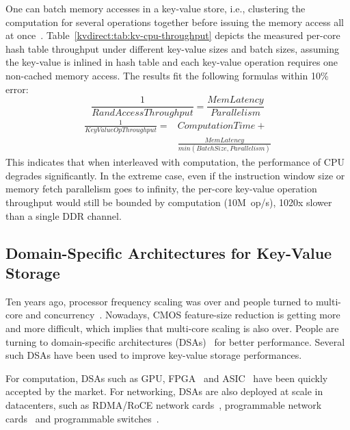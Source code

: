 One can batch memory accesses in a key-value store, i.e., clustering the computation for several operations together before issuing the memory access all at once~\cite{li2016full, narula2014phase}.
Table~\ref{kvdirect:tab:kv-cpu-throughput} depicts the measured per-core hash table throughput under different key-value sizes and batch sizes, assuming the key-value is inlined in hash table and each key-value operation requires one non-cached memory access.
The results fit the following formulas within 10\% error:
\begin{equation}
\frac{1}{RandAccessThroughput} = \frac{MemLatency}{Parallelism}
\end{equation}
\begin{equation}
\begin{aligned}
\frac{1}{KeyValueOpThroughput} = & ComputationTime + \\
      & \frac{MemLatency}{min(BatchSize, Parallelism)}
\end{aligned}
\end{equation}
This indicates that when interleaved with computation, the performance of CPU degrades significantly. In the extreme case, even if the instruction window size or memory fetch parallelism goes to infinity, the per-core key-value operation throughput would still be bounded by computation (\approx10M~op/s), 10\approx20x slower than a single DDR channel.

\subsection{Domain-Specific Architectures for Key-Value Storage}

Ten years ago, processor frequency scaling was over and people turned to multi-core and concurrency~\cite{sutter2005free}.
Nowadays, CMOS feature-size reduction is getting more and more difficult, which implies that multi-core scaling is also over. People are turning to domain-specific architectures (DSAs)~\cite{esmaeilzadeh2013power} for better performance. Several such DSAs have been used to improve key-value storage performances. 

For computation, DSAs such as GPU, 
FPGA~\cite{putnam2014programmable, caulfield2016cloud} and ASIC~\cite{liu2016cambricon, tpu} have been quickly accepted by the market.
For networking, DSAs are also deployed at scale in datacenters, such as RDMA/RoCE network cards~\cite{mellanoxrdma}, programmable network cards~\cite{greenberg2015sdn, li2016clicknp} and programmable switches~\cite{bosshart2013forwarding}.

